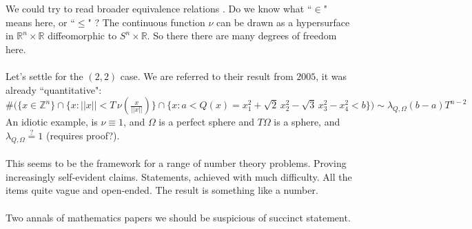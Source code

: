 \documentclass[12pt]{article}
\begin{document}
We could try to read broader equivalence relations .  Do we know what ``$ \in $" means here, or ``$\leq$" ?  The continuous function $\nu$ can be drawn as a hypersurface in $\mathbb{R}^n \times \mathbb{R}$ diffeomorphic to $S^n \times \mathbb{R}$.  So there there are many  degrees of freedom here.  \\ \\
Let's settle for the $(2,2)$ case.  We are referred to their result from $2005$, it was already ``quantitative": 
$$ \# \Big(  \big\{ x \in \mathbb{Z}^n   \big\} \cap \big\{ x : ||x|| < T\, \nu( \tfrac{x}{||x||})  \big\} \cap \big\{ x:  a < Q(x)= x_1^2 + \sqrt{2}\,x_2^2 - \sqrt{3}\,x_3^2 - x_4^2 < b \big\} \Big)   \sim \lambda_{Q, \Omega} (b-a)T^{n-2} $$
An idiotic example, is $\nu \equiv 1$, and $\Omega$ is a perfect sphere and $T\Omega$ is a sphere, and $\lambda_{Q, \Omega} \stackrel{?}{=}1$ (requires proof?).  \\ \\
This seems to be the framework for a range of number theory problems.  Proving increasingly self-evident claims.  Statements, achieved with much difficulty.  All the items quite vague and open-ended.  The result is something like a number. \\ \\
Two annals of mathematics papers we should be suspicious of succinct statement.


\vfill
\end{document}
